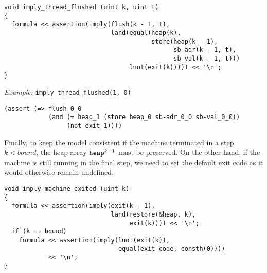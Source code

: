 \begin{lstlisting}[style=c++]
void imply_thread_flushed (uint k, uint t)
{
  formula << assertion(imply(flush(k - 1, t),
                             land(equal(heap(k),
                                        store(heap(k - 1),
                                              sb_adr(k - 1, t),
                                              sb_val(k - 1, t)))
                                  lnot(exit(k))))) << '\n';
}
\end{lstlisting}

\noindent
\emph{Example:} \lstinline[style=c++]{imply_thread_flushed(1, 0)}

\begin{lstlisting}[language=smtlib]
(assert (=> flush_0_0
            (and (= heap_1 (store heap_0 sb-adr_0_0 sb-val_0_0))
                 (not exit_1))))
\end{lstlisting}


\noindent
Finally, to keep the model consistent if the machine terminated in a step $k < bound$, the heap array $\texttt{heap}^{k - 1}$ must be preserved.
On the other hand, if the machine is still running in the final step,
we need to set the default exit code as it would otherwise remain undefined.

\begin{lstlisting}[style=c++]
void imply_machine_exited (uint k)
{
  formula << assertion(imply(exit(k - 1),
                             land(restore(&heap, k),
                                  exit(k)))) << '\n';
  if (k == bound)
    formula << assertion(imply(lnot(exit(k)),
                               equal(exit_code, consth(0))))
            << '\n';
}
\end{lstlisting}

